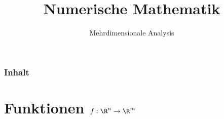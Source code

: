 

\title{Numerische Mathematik}
\subtitle{Mehrdimensionale Analysis}



\makeTitlePage

\begin{frame}\frametitle{Inhalt}
   \tableofcontents
\end{frame}
%

%

\section{Funktionen $f:\R^n \to \R^m$}
\makeSectionDividerPage
%
